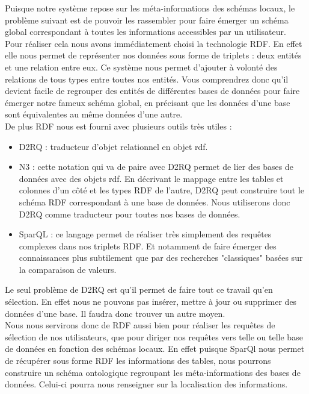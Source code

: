 \documentclass[12pt]{article}
\begin{document}
	Puisque notre système repose sur les méta-informations des schémas locaux, le problème suivant est de pouvoir les rassembler pour faire émerger un schéma global correspondant à toutes les informations accessibles par un utilisateur.\\
	Pour réaliser cela nous avons immédiatement choisi la technologie RDF. En effet elle nous permet de représenter nos données sous forme de triplets : deux entités et une relation entre eux. Ce système nous permet d'ajouter à volonté des relations de tous types entre toutes nos entités. Vous comprendrez donc qu'il devient facile de regrouper des entités de différentes bases de données pour faire émerger notre fameux schéma global, en précisant que les données d'une base sont équivalentes au même données d'une autre.\\
	De plus RDF nous est fourni avec plusieurs outils très utiles :\\
	\begin{itemize}
		\item D2RQ : traducteur d'objet relationnel en objet rdf.
		\item N3 : cette notation qui va de paire avec D2RQ permet de lier des bases de données avec des objets rdf. En décrivant le mappage entre les tables et colonnes d'un côté et les types RDF de l'autre, D2RQ peut construire tout le schéma RDF correspondant à une base de données. Nous utiliserons donc D2RQ comme traducteur pour toutes nos bases de données.\\
		\item SparQL : ce langage permet de réaliser très simplement des requêtes complexes dans nos triplets RDF. Et notamment de faire émerger des connaissances plus subtilement que par des recherches "classiques" basées sur la comparaison de valeurs.\\
	\end{itemize}
	\indent Le seul problème de D2RQ est qu'il permet de faire tout ce travail qu'en sélection. En effet nous ne pouvons pas insérer, mettre à jour ou supprimer des données d'une base. Il faudra donc trouver un autre moyen.\\
	\indent Nous nous servirons donc de RDF aussi bien pour réaliser les requêtes de sélection de nos utilisateurs, que pour diriger nos requêtes vers telle ou telle base de données en fonction des schémas locaux. En effet puisque SparQl nous permet de récupérer sous forme RDF les informations des tables, nous pourrons construire un schéma ontologique regroupant les méta-informations des bases de données. Celui-ci pourra nous renseigner sur la localisation des informations.\\
\end{document}
